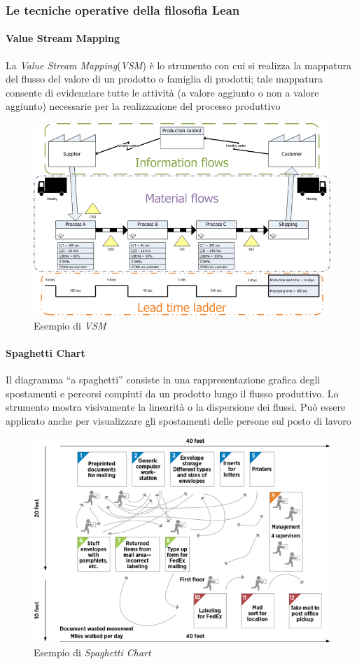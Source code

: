 \subsubsection{Le tecniche operative della filosofia Lean}
\paragraph{Value Stream Mapping}
La \textit{Value Stream Mapping}(\textit{VSM}) è lo strumento con cui si realizza la mappatura del flusso del valore di un prodotto o famiglia di prodotti; tale mappatura consente di evidenziare tutte le attività (a valore aggiunto o non a valore aggiunto) necessarie per la realizzazione del processo produttivo

\begin{figure}[H]
	\includegraphics[width=0.7\linewidth]{resources/chapters/OrganizzazioneAziendale/images/vsm.png}
	\centering
	\caption{Esempio di \textit{VSM}}
\end{figure}

\paragraph{Spaghetti Chart}
Il diagramma “a spaghetti” consiste in una rappresentazione grafica degli spostamenti e percorsi compiuti da un prodotto lungo il flusso produttivo. Lo strumento mostra visivamente la linearità o la dispersione dei flussi. Può essere applicato anche per visualizzare gli spostamenti delle persone sul posto di lavoro

\begin{figure}[H]
	\includegraphics[width=0.8\linewidth]{resources/chapters/OrganizzazioneAziendale/images/spaghetti-chart.png}
	\centering
	\caption{Esempio di \textit{Spaghetti Chart}}
\end{figure}

